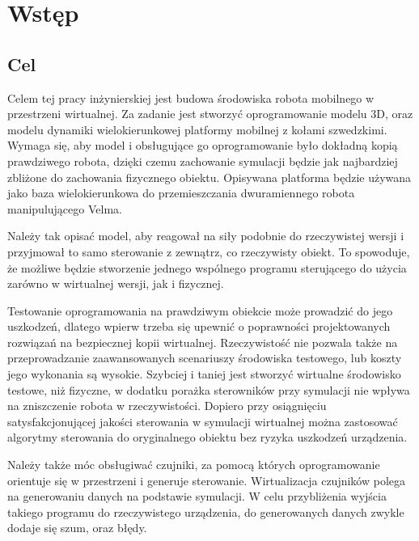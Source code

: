 \chapter{Wstęp}
\section{Cel}
Celem tej pracy inżynierskiej jest budowa środowiska robota mobilnego w przestrzeni wirtualnej.
Za zadanie jest stworzyć oprogramowanie modelu 3D, oraz modelu dynamiki wielokierunkowej platformy mobilnej z kołami szwedzkimi. 
Wymaga się, aby model i obsługujące go oprogramowanie było dokładną kopią prawdziwego robota, dzięki czemu zachowanie symulacji będzie jak najbardziej zbliżone do zachowania fizycznego obiektu.
Opisywana platforma będzie używana jako baza wielokierunkowa do przemieszczania dwuramiennego robota manipulującego Velma.

Należy tak opisać model, aby reagował na siły podobnie do rzeczywistej wersji i przyjmował to samo sterowanie z zewnątrz, co rzeczywisty obiekt.
To spowoduje, że możliwe będzie stworzenie jednego wspólnego programu sterującego do użycia zarówno w wirtualnej wersji, jak i fizycznej.

Testowanie oprogramowania na prawdziwym obiekcie może prowadzić do jego uszkodzeń, dlatego wpierw trzeba się upewnić o poprawności projektowanych rozwiązań na bezpiecznej kopii wirtualnej.
Rzeczywistość nie pozwala także na przeprowadzanie zaawansowanych scenariuszy środowiska testowego, lub koszty jego wykonania są wysokie.
Szybciej i taniej jest stworzyć wirtualne środowisko testowe, niż fizyczne, w dodatku porażka sterowników przy symulacji nie wpływa na zniszczenie robota w rzeczywistości.
Dopiero przy osiągnięciu satysfakcjonującej jakości sterowania w symulacji wirtualnej można zastosować algorytmy sterowania do oryginalnego obiektu bez ryzyka uszkodzeń urządzenia.

Należy także móc obsługiwać czujniki, za pomocą których oprogramowanie orientuje się w przestrzeni i generuje sterowanie.
Wirtualizacja czujników polega na generowaniu danych na podstawie symulacji.
W celu przybliżenia wyjścia takiego programu do rzeczywistego urządzenia, do generowanych danych zwykle dodaje się szum, oraz błędy.

